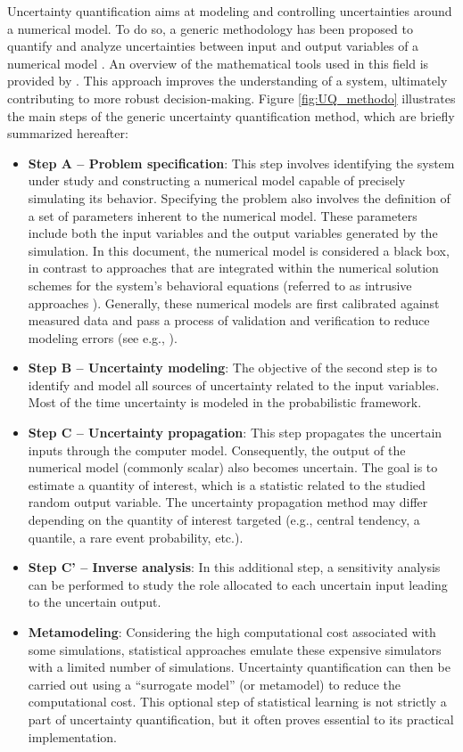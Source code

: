 Uncertainty quantification aims at modeling and controlling uncertainties around a numerical model. 
To do so, a generic methodology has been proposed to quantify and analyze uncertainties between input and output variables of a numerical model \citep{rocquigny_2008,blanchard_2023}. 
An overview of the mathematical tools used in this field is provided by \citet{sullivan_2015}. 
This approach improves the understanding of a system, ultimately contributing to more robust decision-making. 
Figure \ref{fig:UQ_methodo} illustrates the main steps of the generic uncertainty quantification method, which are briefly summarized hereafter: 
\begin{itemize}
    \item \textbf{Step A -- Problem specification}:     
    This step involves identifying the system under study and constructing a numerical model capable of precisely simulating its behavior. 
    Specifying the problem also involves the definition of a set of parameters inherent to the numerical model. 
    These parameters include both the input variables and the output variables generated by the simulation. 
    In this document, the numerical model is considered a black box, in contrast to approaches that are integrated within the numerical solution schemes for the system's behavioral equations (referred to as intrusive approaches \citealp{lemaitre_2010}). 
    Generally, these numerical models are first calibrated against measured data and pass a process of validation and verification to reduce modeling errors (see e.g., \citealp{oberkampf_2010_VVUQ,damblin_2015,carmassi_2018}).  
    \item \textbf{Step B -- Uncertainty modeling}: 
    The objective of the second step is to identify and model all sources of uncertainty related to the input variables. 
    Most of the time uncertainty is modeled in the probabilistic framework.
    \item \textbf{Step C -- Uncertainty propagation}:
    This step propagates the uncertain inputs through the computer model.  
    Consequently, the output of the numerical model (commonly scalar) also becomes uncertain. 
    The goal is to estimate a quantity of interest, which is a statistic related to the studied random output variable. 
    The uncertainty propagation method may differ depending on the quantity of interest targeted (e.g., central tendency, a quantile, a rare event probability, etc.).    
    \item \textbf{Step C' -- Inverse analysis}: 
    In this additional step, a sensitivity analysis can be performed to study the role allocated to each uncertain input leading to the uncertain output. 
    \item \textbf{Metamodeling}: 
    Considering the high computational cost associated with some simulations, statistical approaches emulate these expensive simulators with a limited number of simulations. 
    Uncertainty quantification can then be carried out using a ``surrogate model'' (or metamodel) to reduce the computational cost. 
    This optional step of statistical learning is not strictly a part of uncertainty quantification, but it often proves essential to its practical implementation.
\end{itemize}


